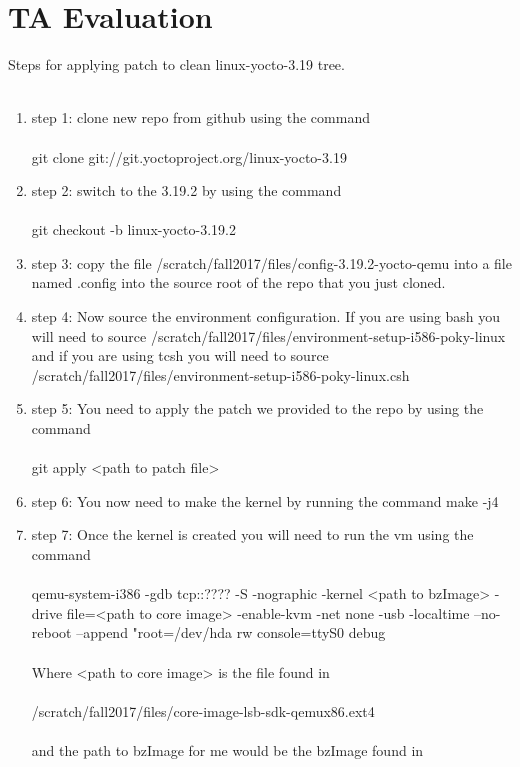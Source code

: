 \documentclass[letterpaper,10pt,titlepage]{article}
\begin{document}
\section{TA Evaluation}
Steps for applying patch to clean linux-yocto-3.19 tree.\\\\
\begin{enumerate}
\item{step 1: }
   clone new repo from github using the command\\\\
   git clone git://git.yoctoproject.org/linux-yocto-3.19
\item{step 2: }
   switch to the 3.19.2 by using the command\\\\
   git checkout -b linux-yocto-3.19.2
\item{step 3: }
   copy the file /scratch/fall2017/files/config-3.19.2-yocto-qemu into a file 
   named .config into the source root of the repo that you just cloned.
\item{step 4: }
   Now source the environment configuration. If you are using bash you will 
   need to source /scratch/fall2017/files/environment-setup-i586-poky-linux 
   and if you are using tcsh you will need  to source 
   /scratch/fall2017/files/environment-setup-i586-poky-linux.csh
\item{step 5: }
   You need to apply the patch we provided to the repo by using the command\\\\
   git apply <path to patch file>
\item{step 6: }
   You now need to make the kernel by running the command make -j4 
\item{step 7: }
   Once the kernel is created you will need to run the vm using the command\\\\
   qemu-system-i386 -gdb tcp::???? -S -nographic -kernel <path to bzImage> -drive file=<path to core image> -enable-kvm -net none -usb -localtime --no-reboot --append "root=/dev/hda rw console=ttyS0 debug\\\\
   Where <path to core image> is the file found in\\\\ 
   /scratch/fall2017/files/core-image-lsb-sdk-qemux86.ext4\\\\
   and the path to bzImage for me would be the bzImage found in\\\\

\end{enumerate}
\end{document}
